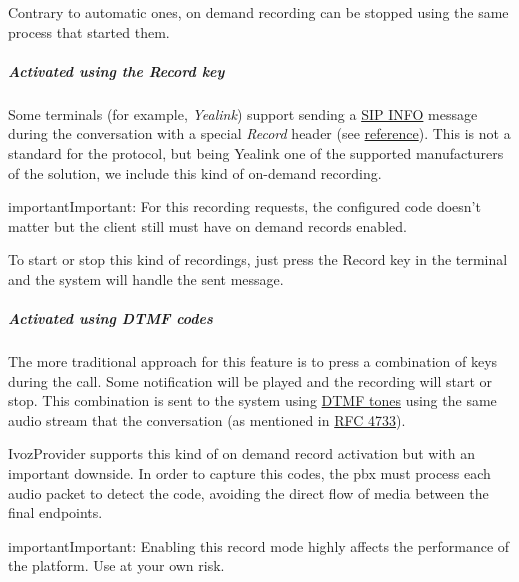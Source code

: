 \documentclass[letterpaper,10pt,english]{sphinxmanual}
\begin{document}
Contrary to automatic ones, on demand recording can be stopped using the same
process that started them.


\subparagraph{Activated using the \emph{Record} key}
\label{administration_portal/client/residential/calls/call_recordings:activated-using-the-record-key}
Some terminals (for example, \emph{Yealink}) support sending a \href{https://tools.ietf.org/html/rfc6086}{SIP INFO} message during the conversation with a
special \emph{Record} header (see \href{http://www.yealink.com/Upload/document/UsingCallRecordingFeatureonYealinkPhones/UsingCallRecordingFeatureonYealinkSIPT2XPphonesRev\_610-20561729764.pdf}{reference}).
This is not a standard for the protocol, but being Yealink one of the supported
manufacturers of the solution, we include this kind of on-demand recording.

\begin{notice}{important}{Important:}
For this recording requests, the configured code doesn't matter
but the client still must have on demand records enabled.
\end{notice}

To start or stop this kind of recordings, just press the Record key in the
terminal and the system will handle the sent message.


\subparagraph{Activated using \emph{DTMF} codes}
\label{administration_portal/client/residential/calls/call_recordings:activated-using-dtmf-codes}
The more traditional approach for this feature is to press a combination of
keys during the call. Some notification will be played and the recording will
start or stop. This combination is sent to the system using \href{https://es.wikipedia.org/wiki/Marcaci\%C3\%B3n\_por\_tonos}{DTMF tones} using the same audio
stream that the conversation (as mentioned in \href{https://tools.ietf.org/html/rfc4733}{RFC 4733}).

IvozProvider supports this kind of on demand record activation but with an
important downside. In order to capture this codes, the pbx must process each
audio packet to detect the code, avoiding the direct flow of media between the
final endpoints.

\begin{notice}{important}{Important:}
Enabling this record mode highly affects the performance of the
platform. Use at your own risk.
\end{notice}
\end{document}

